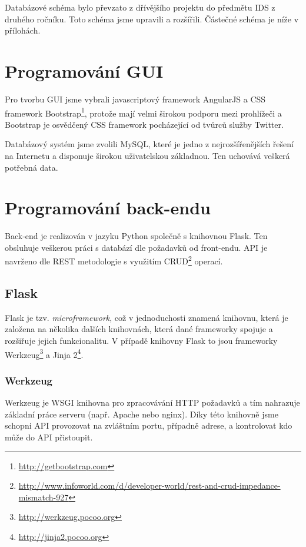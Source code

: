\documentclass[11pt,a4paper]{article}
\begin{document}
Databázové schéma bylo převzato z dřívějšího projektu do předmětu IDS z druhého ročníku. Toto schéma jsme upravili a rozšířili. Částečné schéma je níže v přílohách.

\section*{Programování GUI}

Pro tvorbu GUI jsme vybrali javascriptový framework AngularJS a CSS framework Bootstrap\footnote{\url{http://getbootstrap.com}}, protože mají velmi širokou podporu mezi prohlížeči a Bootstrap je osvědčený CSS framework pocházející od tvůrců služby Twitter.

Databázový systém jsme zvolili MySQL, které je jedno z nejrozšířenějších řešení na Internetu a disponuje širokou uživatelskou základnou. Ten uchovává veškerá potřebná data.



\section*{Programování back-endu}
Back-end je realizován v jazyku Python společně s knihovnou Flask. Ten obsluhuje veškerou práci s databází dle požadavků od front-endu. API je navrženo dle REST metodologie\cite{rest} s využitím CRUD\footnote{\url{http://www.infoworld.com/d/developer-world/rest-and-crud-impedance-mismatch-927}} operací.

\subsection*{Flask}
Flask je tzv. {\em microframework}, což v jednoduchosti znamená knihovnu, která je založena na několika dalších knihovnách, která dané frameworky spojuje a rozšiřuje jejich funkcionalitu. V případě knihovny Flask to jsou frameworky Werkzeug\footnote{\url{http://werkzeug.pocoo.org}} a Jinja 2\footnote{\url{http://jinja2.pocoo.org}}.

\subsubsection*{Werkzeug}
Werkzeug je WSGI knihovna pro zpracovávání HTTP požadavků a tím nahrazuje základní práce serveru (např. Apache nebo nginx). Díky této knihovně jsme schopni API provozovat na zvláštním portu, případně adrese, a kontrolovat kdo může do API přistoupit.
\end{document}
